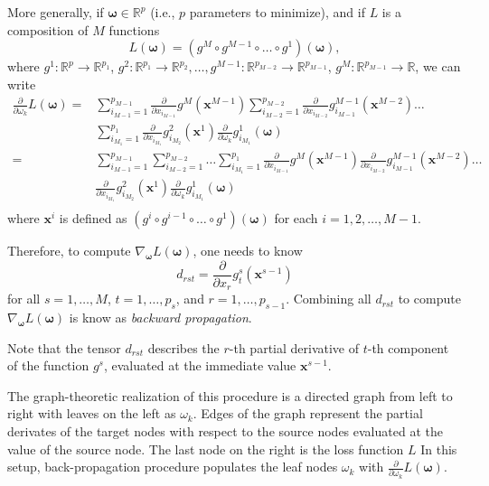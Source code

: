 \documentclass[
]{article}
\newcommand{\1}{\boldsymbol{1}}
\begin{document}
More generally, if \(\boldsymbol{\omega}\in \mathbb{R}^p\) (i.e., \(p\)
parameters to minimize), and if \(L\) is a composition of \(M\)
functions \[
L(\boldsymbol{\omega}) = (g^{M} \circ g^{M-1} \circ \dots \circ g^1)(\boldsymbol{\omega}),
\] where \(g^1: \mathbb{R}^p \to \mathbb{R}^{p_1}\),
\(g^2: \mathbb{R}^{p_1} \to \mathbb{R}^{p_2}, \dots, g^{M-1}: \mathbb{R}^{p_{M-2}} \to \mathbb{R}^{p_{M-1}}\),
\(g^M: \mathbb{R}^{p_{M-1}} \to \mathbb{R}\), we can write
\begin{align*}
    \frac{\partial}{\partial \omega_k} L(\boldsymbol{\omega})  
    = &  
    \sum_{i_{M-1}=1}^{p_{M-1}} 
    \frac{\partial }{\partial x_{i_{M-1}}} g^M(\mathbf{x}^{M-1})
    \sum_{i_{M-2}=1}^{p_{M-2}} 
    \frac{\partial }{\partial x_{i_{M-2}}} g_{i_{M-1}}^{M-1}(\mathbf{x}^{M-2})
    \dots
    \\
    & 
    \sum_{i_{M_1}=1}^{p_1} 
    \frac{\partial }{\partial x_{i_{M_1}}} g_{i_{M_2}}^{2}(\mathbf{x}^1)
    \frac{\partial }{\partial \omega_{k}} g_{i_{M_1}}^{1}(\boldsymbol{\omega})
    \\
    = &  
    \sum_{i_{M-1}=1}^{p_{M-1}} 
    \sum_{i_{M-2}=1}^{p_{M-2}} 
    \dots
    \sum_{i_{M_1}=1}^{p_1} 
    \frac{\partial }{\partial x_{i_{M-1}}} g^M(\mathbf{x}^{M-1})
    \frac{\partial }{\partial x_{i_{M-2}}} g_{i_{M-1}}^{M-1}(\mathbf{x}^{M-2})
    \dots
    \\
    & 
    \frac{\partial }{\partial x_{i_{M_1}}} g_{i_{M_2}}^{2}(\mathbf{x}^1)
    \frac{\partial }{\partial \omega_{k}} g_{i_{M_1}}^{1}(\boldsymbol{\omega})
    \\
\end{align*} where \(\mathbf{x}^i\) is defined as
\((g^i \circ g^{i-1} \circ \dots \circ g^1) (\boldsymbol{\omega})\) for
each \(i=1, 2, \dots, M-1\).

Therefore, to compute
\(\nabla_{\boldsymbol{\omega}} L(\boldsymbol{\omega})\), one needs to
know \[
d_{rst} = \frac{\partial}{\partial x_r} g^s_t(\mathbf{x}^{s-1})
\] for all \(s=1, \dots, M\), \(t=1, \dots, p_s\), and
\(r=1, \dots, p_{s-1}\). Combining all \(d_{rst}\) to compute
\(\nabla_{\boldsymbol{\omega}} L(\boldsymbol{\omega})\) is know as
\emph{backward propagation}.

Note that the tensor \(d_{rst}\) describes the \(r\)-th partial
derivative of \(t\)-th component of the function \(g^s\), evaluated at
the immediate value \(\mathbf{x}^{s-1}\).

The graph-theoretic realization of this procedure is a directed graph
from left to right with leaves on the left as \(\omega_k\). Edges of the
graph represent the partial derivates of the target nodes with respect
to the source nodes evaluated at the value of the source node. The last
node on the right is the loss function \(L\) In this setup,
back-propagation procedure populates the leaf nodes \(\omega_k\) with
\(\frac{\partial}{\partial \omega_k} L(\boldsymbol{\omega})\).
\end{document}
